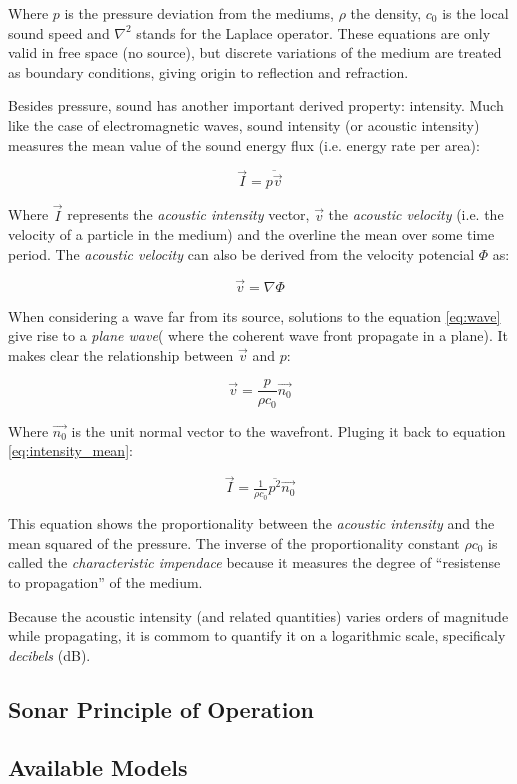 Where $p$ is the pressure deviation from the mediums, $\rho$ the density, $c_0$
is the local sound speed and $\nabla^2$ stands for the Laplace operator. These equations are
only valid in free space (no source), but discrete variations of the medium are
treated as boundary conditions, giving origin to reflection and refraction.

Besides pressure, sound has another important derived property: intensity. Much
like the case of electromagnetic waves, sound intensity (or acoustic intensity)
measures the mean value of the sound energy flux (i.e. energy rate
per area):

\begin{equation}\label{eq:intensity_mean}
\vec{I} = \overline{p\vec{v}}
\end{equation}

Where $\vec{I}$ represents the \textit{acoustic intensity} vector, $\vec{v}$ the
\textit{acoustic velocity} (i.e. the velocity of a particle in the medium) and the
overline the mean over some time period. The \textit{acoustic velocity} can also
be derived from the velocity potencial $\Phi$ as:

\[ \vec{v} = \nabla \Phi\]

When considering a wave far from its source, solutions to the equation
\ref{eq:wave} give rise to a \textit{plane wave}( where the coherent wave front
propagate in a plane). It makes clear the relationship between $\vec{v}$ and
$p$:

\[ \vec{v} = \frac{p}{\rho c_0} \vec{n_0} \]

Where $\vec{n_0}$ is the unit normal vector to the wavefront. Pluging it back to
equation \ref{eq:intensity_mean}:

\begin{equation}\label{eq:intensity_pressure}
\vec{I} = \tfrac{1}{\rho c_0} \overline{p^2} \vec{n_0}
\end{equation}

This equation shows the proportionality between the \textit{acoustic
intensity} and the mean squared of the pressure. The inverse of the
proportionality constant $\rho c_0$ is called the \textit{characteristic
impendace} because it measures the degree of ``resistense to propagation'' of
the medium.



Because the acoustic intensity (and related quantities) varies orders of
magnitude while propagating, it is commom to quantify it on a logarithmic scale,
specificaly \textit{decibels} (dB). 

\subsection{Sonar Principle of Operation}

\cite{LURTON} %

\subsection{Available Models}
 
\cite{sonars:16} %
